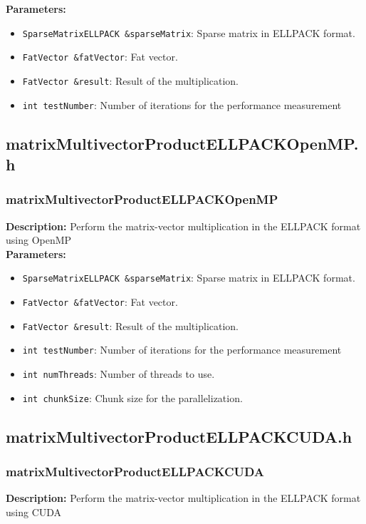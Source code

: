 \documentclass[12pt,oneside]{book} %
\begin{document}
\begin{subappendices}
    \textbf{Parameters:}
    \begin{itemize}
        \item \texttt{SparseMatrixELLPACK \&sparseMatrix}: Sparse matrix in ELLPACK format.
        \item \texttt{FatVector \&fatVector}: Fat vector.
        \item \texttt{FatVector \&result}: Result of the multiplication.
        \item \texttt{int testNumber}: Number of iterations for the performance measurement
    \end{itemize}

    \subsection{matrixMultivectorProductELLPACKOpenMP.h}
    \subsubsection{matrixMultivectorProductELLPACKOpenMP}
    \textbf{Description:} Perform the matrix-vector multiplication in the ELLPACK format using OpenMP\\

    \textbf{Parameters:}
    \begin{itemize}
        \item \texttt{SparseMatrixELLPACK \&sparseMatrix}: Sparse matrix in ELLPACK format.
        \item \texttt{FatVector \&fatVector}: Fat vector.
        \item \texttt{FatVector \&result}: Result of the multiplication.
        \item \texttt{int testNumber}: Number of iterations for the performance measurement
        \item \texttt{int numThreads}: Number of threads to use.
        \item \texttt{int chunkSize}: Chunk size for the parallelization.
    \end{itemize}

    \subsection{matrixMultivectorProductELLPACKCUDA.h}
    \subsubsection{matrixMultivectorProductELLPACKCUDA}
    \textbf{Description:} Perform the matrix-vector multiplication in the ELLPACK format using CUDA\\


\end{subappendices}
\end{document}

